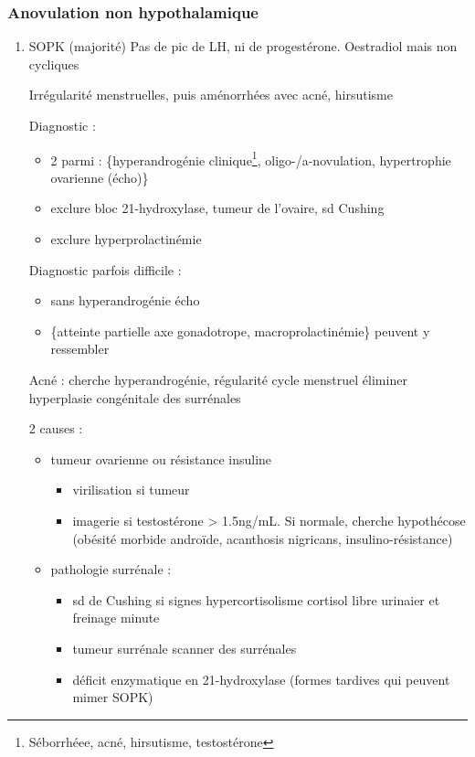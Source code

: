 \documentclass[11pt]{article}
\begin{document}
\subsubsection{Anovulation non hypothalamique}
\label{sec:orgf7cc798}
\begin{enumerate}
\item SOPK (majorité)
\label{sec:org02339fa}
Pas de pic de LH, ni de progestérone. Oestradiol mais non cycliques

Irrégularité menstruelles, puis aménorrhées avec acné, hirsutisme

Diagnostic :
\begin{itemize}
\item 2 parmi : \{hyperandrogénie clinique\footnote{Séborrhéee, acné, hirsutisme, \inc testostérone}, oligo-/a-novulation, hypertrophie
ovarienne (écho)\}
\item exclure bloc 21-hydroxylase, tumeur de l'ovaire, sd Cushing
\item exclure hyperprolactinémie
\end{itemize}

Diagnostic parfois difficile :
\begin{itemize}
\item sans hyperandrogénie \thus écho
\item \{atteinte partielle axe gonadotrope, macroprolactinémie\} peuvent y ressembler
\end{itemize}

Acné : cherche hyperandrogénie, régularité cycle menstruel \thus éliminer
hyperplasie congénitale des surrénales

2 causes :
\begin{itemize}
\item tumeur ovarienne ou résistance insuline
\begin{itemize}
\item virilisation si tumeur
\item imagerie si testostérone > 1.5ng/mL. Si normale, cherche hypothécose
(obésité morbide androïde, acanthosis nigricans, insulino-résistance)
\end{itemize}
\item pathologie surrénale :
\begin{itemize}
\item sd de Cushing si signes hypercortisolisme \thus cortisol libre urinaier et
freinage minute
\item tumeur surrénale \thus scanner des surrénales
\item déficit enzymatique en 21-hydroxylase (\danger formes tardives qui peuvent
mimer SOPK)
\end{itemize}
\end{itemize}
\end{enumerate}
\end{document}
